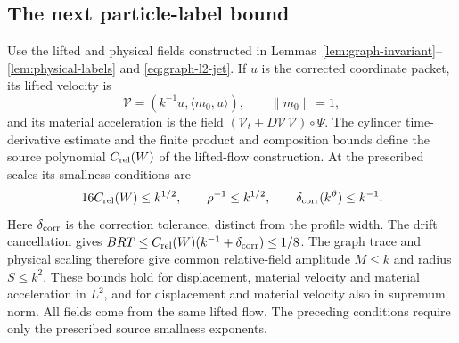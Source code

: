 \documentclass[11pt]{article}
\theoremstyle{definition}
\begin{document}
\subsection{The next particle-label bound}

Use the lifted and physical fields constructed in
Lemmas~\ref{lem:graph-invariant}--\ref{lem:physical-labels} and
\eqref{eq:graph-l2-jet}. If $u$ is the corrected coordinate packet,
its lifted velocity is
\[
 \mathcal V=(k^{-1}u,\langle m_0,u\rangle),\qquad \|m_0\|=1,
\]
and its material acceleration is the field
$(\mathcal V_t+D\mathcal V\,\mathcal V)\circ\Psi$.
The cylinder time-derivative estimate and the finite product and
composition bounds define the source polynomial $C_{\rm rel}(W)$
of the lifted-flow construction. At the prescribed scales its
smallness conditions are
\[
 16C_{\rm rel}(W)\leq k^{1/2},\qquad
 \rho^{-1}\leq k^{1/2},\qquad
 \delta_{\rm corr}(k^\vartheta)\leq k^{-1}.
\]
Here $\delta_{\rm corr}$ is the correction tolerance, distinct from
the profile width. The drift cancellation gives
$BRT\leq C_{\rm rel}(W)(k^{-1}+\delta_{\rm corr})\leq1/8$.
The graph trace and physical scaling therefore give common
relative-field amplitude $M\leq k$ and radius $S\leq k^2$.
These bounds hold for displacement, material velocity and material
acceleration in $L^2$, and for displacement and material velocity
also in supremum norm. All fields come from the same lifted flow. The
preceding conditions require only the prescribed source smallness exponents.
\end{document}
